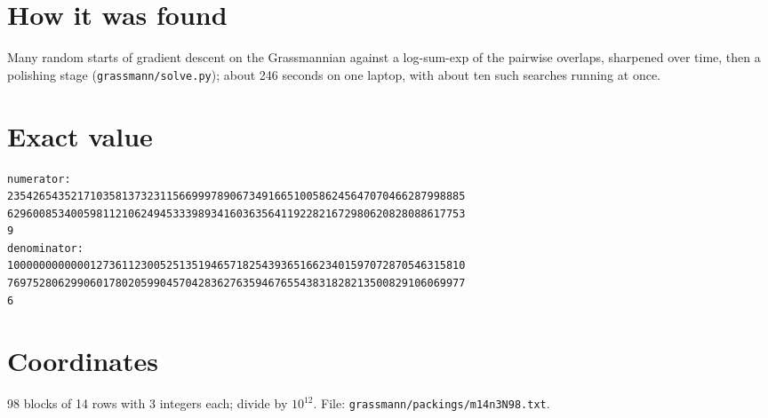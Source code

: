 \documentclass[11pt,a4paper]{article}
\begin{document}
\section{How it was found}
Many random starts of gradient descent on the Grassmannian against a log-sum-exp of the pairwise overlaps, sharpened over time, then a polishing stage (\texttt{grassmann/solve.py}); about 246 seconds on one laptop, with about ten such searches running at once.


\appendix
\section{Exact value}
{\small
\begin{verbatim}
numerator:
235426543521710358137323115669997890673491665100586245647070466287998885
629600853400598112106249453339893416036356411922821672980620828088617753
9
denominator:
100000000000012736112300525135194657182543936516623401597072870546315810
769752806299060178020599045704283627635946765543831828213500829106069977
6
\end{verbatim}}

\section{Coordinates}
98 blocks of 14 rows with 3 integers each; divide by $10^{12}$. File: \texttt{grassmann/packings/m14n3N98.txt}.
{\tiny
\begin{multicols}{3}
\end{multicols}}
\end{document}
